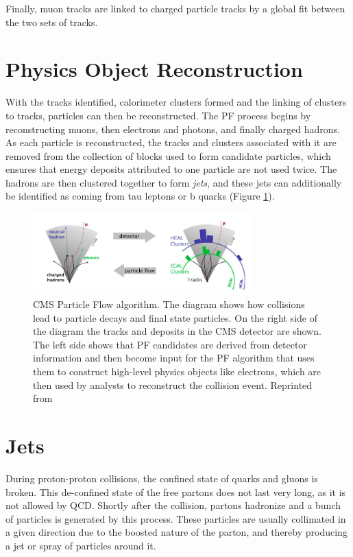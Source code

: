  Finally, muon tracks are linked to charged particle tracks by a global fit between the two sets of tracks.

 \section{Physics Object Reconstruction}

With the tracks identified, calorimeter clusters formed and the linking of clusters to tracks, particles can then be reconstructed. The PF process begins by reconstructing muons, then electrons and photons, and finally charged hadrons. As each particle is reconstructed, the tracks and clusters associated with it are removed from the collection of blocks used to form candidate particles, which ensures that energy deposits attributed to one particle are not used twice. The hadrons are then clustered together to form \textit{jets}, and these jets can additionally be identified as coming from tau leptons or b quarks (Figure \ref{fig:pf}).


 \begin{figure}[h]
  	\label{fig:pf}
 	\centering
 	\includegraphics[width=0.75\textwidth]{figures/jets.png}
 	\singlespace
 	\caption{CMS Particle Flow algorithm. The diagram shows how collisions lead to particle decays and final state particles. On the right side of the diagram the tracks and deposits in the CMS detector are shown. The left side shows that PF candidates are derived from detector information and then become input for the PF algorithm that uses them to construct high-level physics objects like electrons, which are then used by analysts to reconstruct the collision event. Reprinted from \cite{CMS-PAS-PFT-09-001}}
 \end{figure}

\section{Jets}

During proton-proton collisions, the confined state of quarks and gluons is broken. This de-confined state of the free partons does not last very long, as it is not allowed by QCD. Shortly after the collision, partons hadronize and a bunch of particles is generated by this process. These particles are usually collimated in a given direction due to the boosted nature of the parton, and thereby producing a jet or spray of particles around it.

